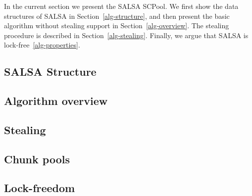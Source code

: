 In the current section we present the SALSA SCPool. We first show the data structures of SALSA in Section~\ref{alg-structure}, and then present the basic algorithm without stealing support in Section~\ref{alg-overview}. The stealing procedure is described in Section~\ref{alg-stealing}. 
Finally, we argue that SALSA is lock-free~\ref{alg-properties}. 

\subsection{SALSA Structure\label{alg-structure}}

\subsection{Algorithm overview\label{alg-overview}}

\subsection{Stealing\label{alg-stealing}}
\subsection{Chunk pools\label{alg-pools}}
\subsection{Lock-freedom\label{alg-properties}}

